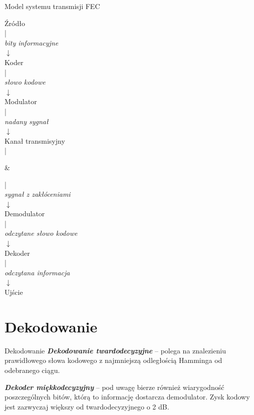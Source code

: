 \documentclass[12pt]{beamer}
\begin{document}
\begin{frame}{Model systemu transmisji FEC}
\centering
\begin{minipage}[t]{100pt}{
\centering
Źródło\\|\\ \emph{bity informacyjne}\\ $\downarrow$\\  Koder\\|\\ \emph{słowo kodowe}\\ $\downarrow$\\ Modulator\\|\\ \emph{nadany sygnał}\\ $\downarrow$\\ Kanał transmisyjny\\|\\ }
\end{minipage}
&
\begin{minipage}[t]{100pt}
\centering
|\\
\emph{sygnał z zakłóceniami} \\$\downarrow$\\
Demodulator\\|\\ \emph{odczytane słowo kodowe}\\ $\downarrow$\\ Dekoder\\|\\ \emph{odczytana informacja}\\ $\downarrow$\\ Ujście
\end{minipage}
\end{frame}


\section{Dekodowanie}
\begin{frame}{Dekodowanie}
\emph{\textbf{Dekodowanie twardodecyzyjne}} -- polega na znalezieniu prawidłowego słowa kodowego z najmniejszą odległością Hamminga od odebranego ciągu.

\emph{\textbf{Dekoder miękkodecyzyjny}} -- pod uwagę bierze również wiarygodność poszczególnych bitów, którą to informację dostarcza demodulator. Zysk kodowy jest zazwyczaj większy od twardodecyzyjnego o 2 dB.
\end{frame}
\end{document}
